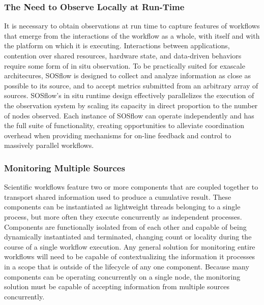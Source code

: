 \subsubsection{The Need to Observe Locally at Run-Time}
It is necessary to obtain observations at run time to capture features
of workflows that emerge from the interactions of the workflow as a whole,
with itself and with the platform on which it is executing.
%
Interactions between applications, contention over shared resources,
hardware state, and data-driven behaviors require some form of in situ
observation.
%
To be practically suited for exascale architecures, SOSflow is
designed to collect and analyze information as close as possible to
its source, and to accept metrics submitted from an arbitrary array of
sources.
%
SOSflow's in situ runtime design effectively parallelizes the execution of
the observation system by scaling its capacity in direct proportion to
the number of nodes observed.
%
Each instance of SOSflow can operate independently and has the full
suite of functionality, creating opportunities to alleviate
coordination overhead when providing mechanisms for on-line feedback
and control to massively parallel workflows.

\subsubsection{Monitoring Multiple Sources}
Scientific workflows feature two or more components that are coupled
together to transport shared information used to produce a cumulative
result.
%
These components can be instantiated as lightweight threads belonging
to a single process, but more often they execute concurrently as
independent processes.
%
Components are functionally isolated from of each other and capable of
being dynamically instantiated and terminated, changing count or
locality during the course of a single workflow execution.
%
Any general solution for monitoring entire workflows will need to be
capable of contextualizing the information it processes in a scope
that is outside of the lifecycle of any one component.
%
Because many components can be operating concurrently on a single
node, the monitoring solution must be capable of accepting
information from multiple sources concurrently.

